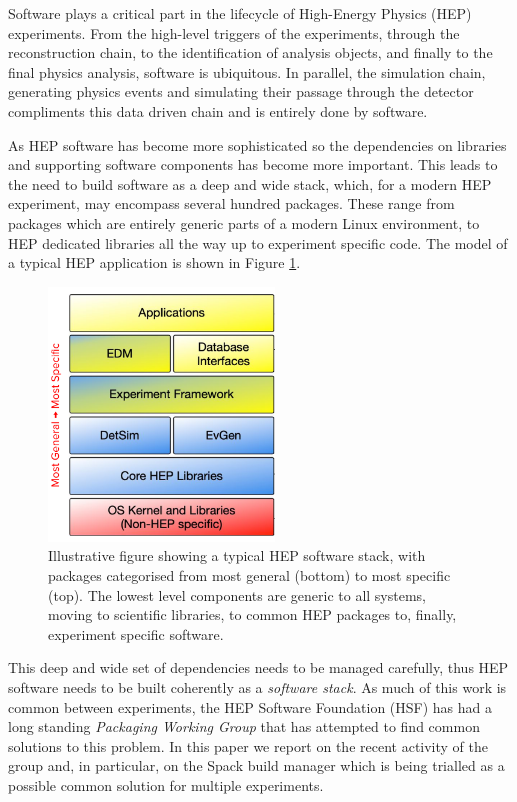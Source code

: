 \documentclass{webofc}
\begin{document}
Software plays a critical part in the lifecycle of High-Energy Physics (HEP)
experiments. From the high-level triggers of the experiments, through the
reconstruction chain, to the identification of analysis objects, and finally to
the final physics analysis, software is ubiquitous. In parallel, the simulation
chain, generating physics events and simulating their passage through the
detector compliments this data driven chain and is entirely done by software.

As HEP software has become more sophisticated so the dependencies on libraries
and supporting software components has become more important. This leads to the need to
build software as a deep and wide stack, which, for a modern HEP experiment, may
encompass several hundred packages. These range from packages which are entirely generic
parts of a modern Linux environment, to HEP dedicated libraries all the way up to
experiment specific code. The model of a typical HEP application is shown in
Figure \ref{fig:stack}.

\begin{figure}[h]
\centering
\includegraphics[width=6cm]{stack.png}
\caption{Illustrative figure showing a typical HEP software stack, with packages
categorised from most general (bottom) to most specific (top). The lowest level
components are generic to all systems, moving to scientific libraries, to common
HEP packages to, finally, experiment specific software.}
\label{fig:stack}
\end{figure}

This deep and wide set of dependencies needs to be managed carefully, thus HEP
software needs to be built coherently as a \emph{software stack}. As much of
this work is common between experiments, the HEP Software Foundation (HSF) has
had a long standing \emph{Packaging Working Group}\cite{HSFPWG} that has attempted to find
common solutions to this problem. In this paper we report on the recent activity
of the group and, in particular, on the Spack build manager which is being
trialled as a possible common solution for multiple experiments.
\end{document}
